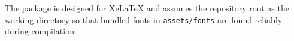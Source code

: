 
The package is designed for XeLaTeX and assumes the repository root as the
working directory so that bundled fonts in \texttt{assets/fonts} are found
reliably during compilation.


